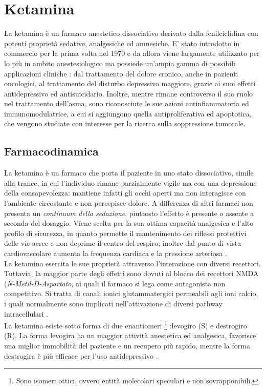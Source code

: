 \section{Ketamina}

La ketamina è un farmaco anestetico dissociativo derivato dalla fenilciclidina con potenti proprietà sedative, analgesiche ed amnesiche. E' stato introdotto in commercio per la prima volta nel 1970 e da allora viene largamente utilizzato per lo più in ambito anestesiologico ma possiede un'ampia gamma di possibili applicazioni cliniche \cite{Ketamineapplication2019}: dal trattamento del dolore cronico, anche in pazienti oncologici, al trattamento del disturbo depressivo maggiore, grazie ai suoi effetti antidepressivo ed antisuicidario. Inoltre, mentre rimane controverso il suo ruolo nel trattamento dell'asma, sono riconosciute le sue azioni antinfiammatoria ed immunomodulatrice, a cui si aggiungono quella antiproliferativa ed apoptotica, che vengono studiate con interesse per la ricerca sulla soppressione tumorale.

\subsection*{Farmacodinamica}

La ketamina è un farmaco che porta il paziente in uno stato dissociativo, simile alla trance, in cui l'individuo rimane parzialmente vigile ma con una depressione della consapevolezza: mantiene infatti gli occhi aperti ma non interagisce con l'ambiente circostante e non percepisce dolore. A differenza di altri farmaci non presenta un \emph{continuum della sedazione}, piuttosto l'effetto è presente o assente a seconda del dosaggio. Viene scelta per la sua ottima capacità analgesica e l'alto profilo di sicurezza, in quanto permette il mantenimento dei riflessi protettivi delle vie aeree e non deprime il centro del respiro; inoltre dal punto di vista cardiovascolare aumenta la frequenza cardiaca e la pressione arteriosa \cite{Krauss2006}. 
\\La ketamina esercita le sue proprietà attraverso l'interazione con diversi recettori. Tuttavia, la maggior parte degli effetti sono dovuti al blocco dei recettori NMDA (\emph{N-Metil-D-Aspartato}, ai quali il farmaco si lega come antagonista non competitivo. Si tratta di canali ionici glutammatergici permeabili agli ioni calcio, i quali normalmente sono implicati nell'attivazione di diversi pathway intracellulari \cite{Zanos2018}.
\\La ketamina esiste sotto forma di due enantiomeri \footnote{Sono isomeri ottici, ovvero entità molecolari speculari e non sovrapponibili.} :levogiro (S) e destrogiro (R). La forma levogira ha un maggior attività anestetica ed analgesica, favorisce una miglior immobilità del paziente e un recupero più rapido, mentre la forma destrogira è più efficace per l'uso antidepressivo \cite{Simeupsedazione}.

